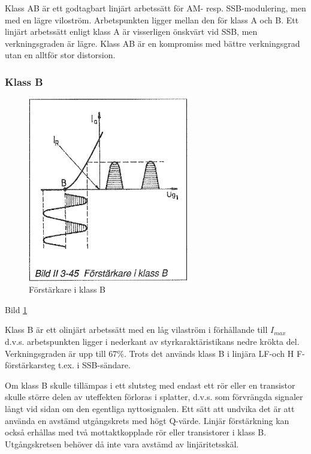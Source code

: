 Klass AB är ett godtagbart linjärt arbetssätt för AM-
resp. SSB-modulering, men med en lägre viloström. Arbetspunkten ligger
mellan den för klass A och B. Ett linjärt arbetssätt enligt klass A är
visserligen önskvärt vid SSB, men verkningsgraden är lägre. Klass AB
är en kompromiss med bättre verkningsgrad utan en alltför stor
distorsion.

\subsubsection{Klass B}

\begin{figure}[h]
\begin{center}
\includegraphics[width=7cm]{images/bild_2_3-45}
\caption{Förstärkare i klass B}
\label{fig:BildII3-45}
\end{center}
\end{figure}

Bild \ref{fig:BildII3-45}

Klass B är ett olinjärt arbetssätt med en låg vilaström i förhållande
till \(I_{max}\) d.v.s. arbetspunkten ligger i nederkant av
styrkaraktäristikans nedre krökta del. Verkningsgraden är upp till
67\%. Trots det används klass B i linjära LF-och H F-förstärkarsteg
t.ex. i SSB-sändare.

Om klass B skulle tillämpas i ett slutsteg med endast ett rör eller en
transistor skulle större delen av uteffekten förloras i splatter,
d.v.s. som förvrängda signaler långt vid sidan om den egentliga
nyttosignalen. Ett sätt att undvika det är att använda en avstämd
utgångskrets med högt Q-värde. Linjär förstärkning kan också erhållas
med två mottaktkopplade rör eller transistorer i klass B.
Utgångskretsen behöver då inte vara avstämd av linjäritetsskäl.

